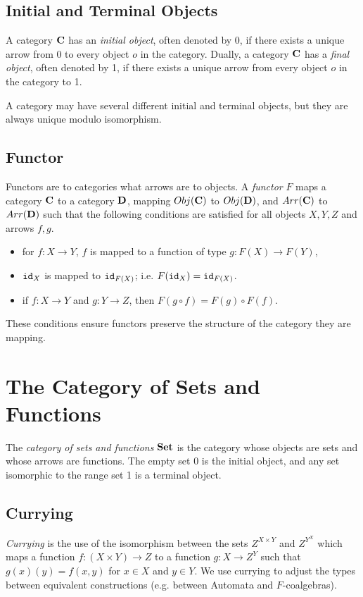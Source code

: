 \subsection{Initial and Terminal Objects}
A category $\AsCategory{C}$ has an \emph{initial object}, often denoted by 0, if there exists a unique arrow from $0$ to every object $o$ in the category. Dually, a category $\AsCategory{C}$ has a \emph{final object}, often denoted by 1, if there exists a unique arrow from every object $o$ in the category to 1. 

A category may have several different initial and terminal objects, but they are always unique modulo isomorphism.

\subsection{Functor}
Functors are to categories what arrows are to objects. A \emph{functor} $F$ maps a category $\AsCategory{C}$ to a category $\AsCategory{D}$, mapping $Obj(\AsCategory{C})$ to $Obj(\AsCategory{D})$, and $Arr(\AsCategory{C})$ to $Arr(\AsCategory{D})$ such that the following conditions are satisfied for all objects $X, Y, Z$ and arrows $f,g$.
\begin{itemize}
    \item for $f\colon X\rightarrow Y$, $f$ is mapped to a function of type $g\colon F(X)\rightarrow F(Y)$,
    \item ${\texttt{id}}_X$ is mapped to ${\texttt{id}}_{F(X)}$; i.e. $F({\texttt{id}}_{X})={\texttt{id}}_{F(X)}$.
    \item if $f\colon X\rightarrow Y$ and $g\colon Y\rightarrow Z$, then $F(g\circ f)=F(g)\circ F(f)$.
\end{itemize}
These conditions ensure functors preserve the structure of the category they are mapping.

\section{The Category of Sets and Functions}
The \emph{category of sets and functions} $\AsCategory{Set}$ is the category whose objects are sets and whose arrows are functions. The empty set $0$ is the initial object, and any set isomorphic to the range set 1 is a terminal object.

\subsection{Currying}
\emph{Currying} is the use of the isomorphism between the sets $Z^{X\times Y}$ and $Z^{Y^X}$ which maps a function $f\colon (X\times Y)\rightarrow Z$ to a function $g\colon X\rightarrow Z^Y$ such that $g(x)(y)=f(x,y)$ for $x\in X$ and $y\in Y$. We use currying to adjust the types between equivalent constructions (e.g. between Automata and $F$-coalgebras).

